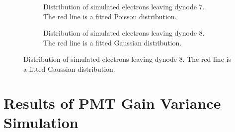 \begin{figure}
\vspace{3mm}

\begin{subfigure}[b]{0.44\textwidth}
\caption{Distribution of simulated electrons leaving dynode 7. The red line is a fitted Poisson distribution.}
\end{subfigure}
\hspace{3mm}
\begin{subfigure}[b]{0.44\textwidth}
\caption{Distribution of simulated electrons leaving dynode 8. The red line is a fitted Gaussian distribution.}
\end{subfigure}
\end{figure}

\section{Results of PMT Gain Variance Simulation}


